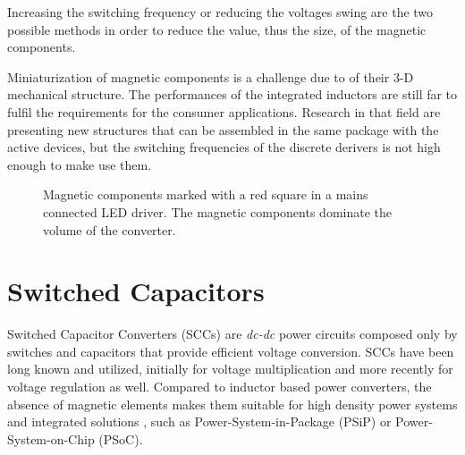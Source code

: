 Increasing the switching frequency or reducing the voltages swing are the two possible methods in order to reduce the value, thus the size, of the magnetic components.

Miniaturization of magnetic components is a challenge due to of their 3-D mechanical structure.
The performances of the integrated inductors are still far to fulfil the requirements for the consumer applications.  Research in that field are presenting new structures that can be assembled in the same package with the active devices, but the switching frequencies of the discrete derivers is not high enough to make use them.

      \begin{figure}[!h]
      \centering
        \caption{Magnetic components marked with a red square in a mains connected LED driver. The magnetic components dominate the volume of the converter.}
        \label{fig:smps_driver}
      \end{figure}






\section{Switched Capacitors}
Switched Capacitor Converters (SCCs) are \emph{dc-dc} power circuits composed only by switches and capacitors that provide efficient voltage conversion. SCCs have been long known and utilized, initially for voltage multiplication and more recently for voltage regulation as well. Compared to inductor based power converters, the absence of magnetic elements makes them suitable for high density power systems and integrated solutions , such as Power-System-in-Package (PSiP) or Power-System-on-Chip (PSoC).

